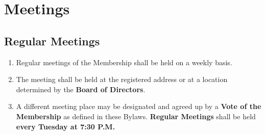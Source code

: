 \documentclass{article}
\begin{document}
\section{Meetings}
\subsection{Regular Meetings}
\begin{enumerate}
    \item Regular meetings of the Membership shall be held on a weekly basis.
    \item The meeting shall be held at the registered address or at a location determined by the \textbf{Board of Directors}.
    \item A different meeting place may be designated and agreed up by a \textbf{Vote of the Membership} as defined in these Bylaws. \textbf{Regular Meetings} shall be held \textbf{every Tuesday at 7:30 P.M.}
\end{enumerate}
\end{document}
